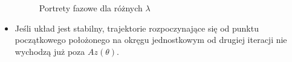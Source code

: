 \documentclass[a4paper, 12pt]{article}
\begin{document}
\begin{itemize}
\begin{figure}[h]
\begin{center}
				\caption{Portrety fazowe dla różnych $\lambda$}
			\end{center}
		\end{figure}
		\item Jeśli układ jest stabilny, trajektorie rozpoczynające się od punktu początkowego położonego na okręgu jednostkowym od drugiej iteracji nie wychodzą już poza $Az(\theta)$. 
	\end{itemize}
	
	
	
	
\end{document}
